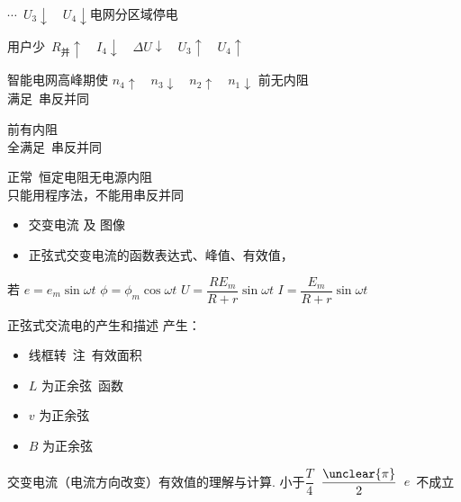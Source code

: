 \noindent {}
\noindent $\cdots$\ $U_3\downarrow$\ \ $U_4\downarrow$\quad 电网分区域停电%

\noindent 用户少\ $R_{\text{并}}\uparrow$\ \ $I_4\downarrow$\ \ $\Delta U\downarrow$\ \ $U_3\uparrow$\ \ $U_4\uparrow$%

\noindent 智能电网\quad 高峰期使 $n_4\uparrow$\ \ $n_3\downarrow$\ \ $n_2\uparrow$\ \ $n_1\downarrow$
\noindent 前无内阻\\
满足\ 串反并同%

\noindent 前有内阻\\
全满足\ 串反并同

\noindent 正常\ 恒定电阻无电源内阻\\
只能用程序法，不能用串反并同
\begin{itemize}
\item 交变电流 及 图像
\item 正弦式交变电流的函数表达式、峰值、有效值，
\end{itemize}
若 $e=e_m\sin\omega t$ \qquad $\phi=\phi_m\cos\omega t$ \qquad $U=\dfrac{RE_m}{R+r}\sin\omega t$ \qquad $I=\dfrac{E_m}{R+r}\sin\omega t$

正弦式交流电的产生和描述 \quad 产生：
\begin{itemize}
\item 线框转\ 注\ 有效面积
\item $L$ 为正余弦\ 函数
\item $v$ 为正余弦
\item $B$ 为正余弦
\end{itemize}
交变电流（电流方向改变）\quad 有效值的理解与计算. \quad 小于$\dfrac{T}{4}$\ $\dfrac{\unclear{\pi}}{2}$\ $e$\ 不成立

